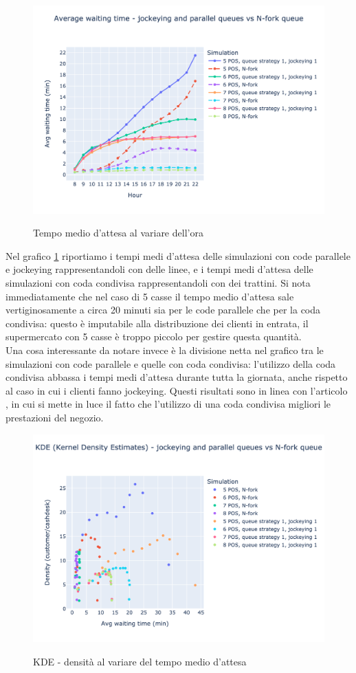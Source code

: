 \begin{figure}[H]
	\centering
	\includegraphics[width=12cm]{"images/results/avg_wt_codacondivisa.png"}
	\label{fig:avg_wt_codacondivisa}
	\caption{Tempo medio d'attesa al variare dell'ora}
\end{figure}

Nel grafico \ref{fig:avg_wt_codacondivisa} riportiamo i tempi medi d'attesa delle simulazioni con code parallele e jockeying rappresentandoli con delle linee, e i tempi medi d'attesa delle simulazioni con coda condivisa rappresentandoli con dei trattini. Si nota immediatamente che nel caso di 5 casse il tempo medio d'attesa sale vertiginosamente a circa 20 minuti sia per le code parallele che per la coda condivisa: questo è imputabile alla distribuzione dei clienti in entrata, il supermercato con 5 casse è troppo piccolo per gestire questa quantità. \\
Una cosa interessante da notare invece è la divisione netta nel
grafico tra le simulazioni con code parallele e quelle con coda
condivisa: l'utilizzo della coda condivisa abbassa i tempi medi
d'attesa durante tutta la giornata, anche rispetto al caso in cui i
clienti fanno jockeying. Questi risultati sono in linea con l'articolo
\cite{yanagisawa2011methods}, in cui si mette in luce il fatto che
l'utilizzo di una coda condivisa migliori le prestazioni del negozio.

\begin{figure}[H]
	\centering
	\includegraphics[width=12cm]{"images/results/kde_codacondivisa.png"}
	\label{fig:kde_codacondivisa}
	\caption{KDE - densità al variare del tempo medio d'attesa}
\end{figure}

